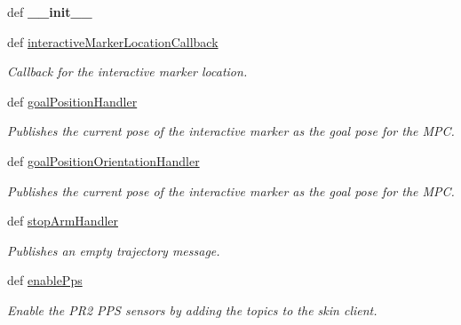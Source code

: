 \begin{DoxyCompactItemize}
\item 
\hypertarget{classhrl__haptic__mpc_1_1mpc__teleop__rviz_1_1_m_p_c_teleop_interactive_markers_acd73850480116c8fefd28255d91313ee}{def {\bfseries \-\_\-\-\_\-init\-\_\-\-\_\-}}\label{classhrl__haptic__mpc_1_1mpc__teleop__rviz_1_1_m_p_c_teleop_interactive_markers_acd73850480116c8fefd28255d91313ee}

\item 
def \hyperlink{classhrl__haptic__mpc_1_1mpc__teleop__rviz_1_1_m_p_c_teleop_interactive_markers_ac5ef2f5573188cb85e8726a4ce40a38d}{interactive\-Marker\-Location\-Callback}
\begin{DoxyCompactList}\small\item\em \-Callback for the interactive marker location. \end{DoxyCompactList}\item 
def \hyperlink{classhrl__haptic__mpc_1_1mpc__teleop__rviz_1_1_m_p_c_teleop_interactive_markers_ac6001a2407c269cf565360ed01b718e5}{goal\-Position\-Handler}
\begin{DoxyCompactList}\small\item\em \-Publishes the current pose of the interactive marker as the goal pose for the \-M\-P\-C. \end{DoxyCompactList}\item 
def \hyperlink{classhrl__haptic__mpc_1_1mpc__teleop__rviz_1_1_m_p_c_teleop_interactive_markers_a0dc6eacfa5ac8f5114222e4baf0daea1}{goal\-Position\-Orientation\-Handler}
\begin{DoxyCompactList}\small\item\em \-Publishes the current pose of the interactive marker as the goal pose for the \-M\-P\-C. \end{DoxyCompactList}\item 
def \hyperlink{classhrl__haptic__mpc_1_1mpc__teleop__rviz_1_1_m_p_c_teleop_interactive_markers_a61a71e93dd026a2216c0289ff873df38}{stop\-Arm\-Handler}
\begin{DoxyCompactList}\small\item\em \-Publishes an empty trajectory message. \end{DoxyCompactList}\item 
def \hyperlink{classhrl__haptic__mpc_1_1mpc__teleop__rviz_1_1_m_p_c_teleop_interactive_markers_a39b0e73d7037411e5d208ef48a497ec4}{enable\-Pps}
\begin{DoxyCompactList}\small\item\em \-Enable the \-P\-R2 \-P\-P\-S sensors by adding the topics to the skin client. \end{DoxyCompactList}\item 

\end{DoxyCompactItemize}
